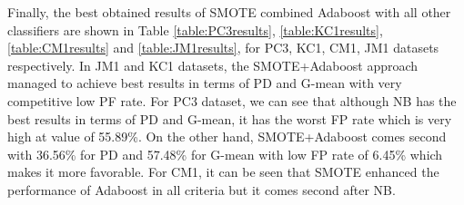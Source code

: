 \documentclass[runningheads,a4paper]{llncs}
\begin{document}
Finally, the best obtained results of SMOTE combined Adaboost with all other classifiers are shown in Table \ref{table:PC3results}, \ref{table:KC1results}, \ref{table:CM1results} and \ref{table:JM1results}, for PC3, KC1, CM1, JM1 datasets respectively. In JM1 and KC1 datasets, the SMOTE+Adaboost approach managed to achieve best results in terms of PD and G-mean with very competitive low PF rate. For PC3 dataset, we can see that although NB has the best results in terms of PD and G-mean, it has the worst FP rate which is very high at value of 55.89\%. On the other hand, SMOTE+Adaboost comes second with 36.56\%  for PD and 57.48\% for G-mean with low FP rate of 6.45\% which makes it more favorable. For CM1, it can be seen that SMOTE enhanced the performance of Adaboost in all criteria but it comes second after NB. 



\begin{table}[H]
\caption{Evaluation results for PC3 dataset}
\begin{centering}
\par\end{centering}
\label{table:PC3results}
\end{table}


\begin{table}[H]
\caption{Evaluation results for KC1 dataset}
\begin{centering}
\par\end{centering}
\label{table:KC1results}
\end{table}
\end{document}
